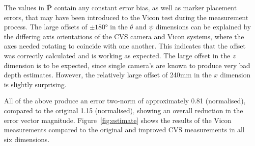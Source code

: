 The values in $\bar{\bm{P}}$ contain any constant error bias, as well as marker placement errors, that may have been introduced to the Vicon test during the measurement process. The large offsets of $\pm\ang{180}$ in the $\theta$ and $\psi$ dimensions can be explained by the differing axis orientations of the CVS camera and Vicon systems, where the axes needed rotating to coincide with one another. This indicates that the offset was correctly calculated and is working as expected. The large offset in the $z$ dimension is to be expected, since single camera's are known to produce very bad depth estimates. However, the relatively large offset of 240mm in the $x$ dimension is slightly surprising. %

All of the above produce an error two-norm of approximately 0.81 (normalised), compared to the original 1.15 (normalised), showing an overall reduction in the error vector magnitude. Figure~\ref{fig:estimate} shows the results of the Vicon measurements compared to the original and improved CVS measurements in all six dimensions.

